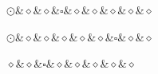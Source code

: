 \begin{exe}
\ex\label{ex:stanford-all}
\begin{minipage}[t]{2.5\treewidth}
\begin{xlist}

\begin{multicols}{2}

\ex
\begin{minipage}[b][\treeheight]{\treewidth}
\vfill
\begin{dependency}[theme = simple, baseline=-\the\dimexpr\fontdimen22\textfont2\relax]
    \begin{deptext}
        $\odot$\&$\diamond$\&$\diamond$\&$\square$\&$\diamond$\&$\diamond$\&$\diamond$\&$\diamond$\&$\diamond$\\
    \end{deptext}
\end{dependency}
\end{minipage}

\columnbreak

\ex
\begin{minipage}[b][\treeheight]{\treewidth}
\begin{dependency}[theme = simple, baseline=-\the\dimexpr\fontdimen22\textfont2\relax]
    \begin{deptext}
        $\odot$\&$\diamond$\&$\diamond$\&$\diamond$\&$\diamond$\&$\diamond$\&$\square$\&$\diamond$\&$\diamond$\\
    \end{deptext}
\end{dependency}
\end{minipage}
\end{multicols}

\begin{multicols}{2}

\ex
\begin{minipage}[b][\treeheight]{\treewidth}
\vfill
\phantom{$\odot$}\hspace{\fontdimen4\font}
\begin{dependency}[theme = simple, baseline=-\the\dimexpr\fontdimen22\textfont2\relax]
    \begin{deptext}
        $\diamond$\&$\diamond$\&$\square$\&$\diamond$\&$\diamond$\&$\diamond$\&$\diamond$\&$\diamond$\\
    \end{deptext}
\end{dependency}
\end{minipage}


\end{multicols}
\end{xlist}
\end{minipage}
\end{exe}
